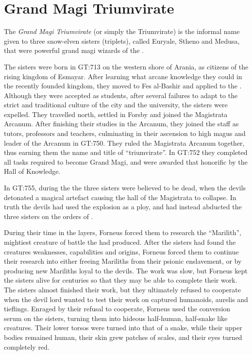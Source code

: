 \section{Grand Magi Triumvirate}
\label{sec:Triumvirate}

The \emph{Grand Magi Triumvirate} (or simply the Triumvirate) is the informal
name given to three snow-elven sisters (triplets), called Euryale, Stheno and
Medusa, that were powerful grand magi wizards of the .

The sisters were born in GT:713 on the western shore of Arania, as citizens of
the rising kingdom of Esmayar. After learning what arcane knowledge they could
in the recently founded kingdom, they moved to Fes al-Bashir and applied to the
. Although they were accepted as students, after
several failures to adapt to the strict and traditional culture of the city and
the university, the sisters were expelled. They travelled north, settled in
Forsby and joined the Magistrata Arcanum. After finishing their studies in the
Arcanum, they joined the staff as tutors, professors and teachers, culminating
in their ascension to high magus and leader of the Arcanum in GT:750. They
ruled the Magistrata Arcanum together, thus earning them the name and title of
``triumvirate''. In GT:752 they completed all tasks required to become Grand
Magi, and were awarded that honorific by the Hall of Knowledge.

In GT:755, during the  the three sisters
were believed to be dead, when the devils detonated a magical artefact causing
the hall of the Magistrata to collapse. In truth the devils had used the
explosion as a ploy, and had instead abducted the three sisters on the orders
of .

During their time in the layers, Forneus forced them to research the
``Marilith'', mightiest creature of battle the  had
produced. After the sisters had found the creatures weaknesses, capabilities
and origins, Forneus forced them to continue their research into either
freeing Mariliths from their psionic enslavement, or by producing new
Mariliths loyal to the devils. The work was slow, but Forneus kept the sisters
alive for centuries so that they may be able to complete their work. The
sisters almost finished their work, but they ultimately refused to cooperate
when the devil lord wanted to test their work on captured humanoids, aurelis
and tieflings. Enraged by their refusal to cooperate, Forneus used the
conversion serum on the sisters, turning them into hideous half-human,
half-snake like creatures. Their lower torsos were turned into that of a
snake, while their upper bodies remained human, their skin grew patches of
scales, and their eyes turned completely red.

